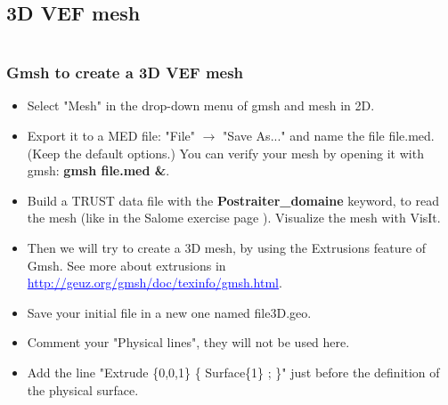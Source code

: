 \documentclass[10pt, hyperref={unicode=true,pdfusetitle, bookmarks=true,bookmarksnumbered=false,bookmarksopen=false, breaklinks=false,pdfborder={0 0 1},backref=true,colorlinks=true,linkcolor=darkblue,pageanchor}]{beamer}
\begin{document}
\subsection{3D VEF mesh}
\begin{frame}
\begin{columns}[c] 
\tableofcontents[sections={1-9},currentsection, currentsubsection]
\tableofcontents[sections={10-16},currentsection, currentsubsection]
\end{columns}
\end{frame}
\begin{frame}
\frametitle{Gmsh to create a 3D VEF mesh}
\begin{block}{}

\begin{itemize}
\item Select "Mesh" in the drop-down menu of gmsh and mesh in 2D.
\item Export it to a MED file: "File" $\rightarrow$ "Save As..." and name the file file.med. (Keep the default options.) You can verify your mesh by opening it with gmsh: \textbf{gmsh file.med \&}.
\item Build a TRUST data file with the \textbf{Postraiter\_domaine} keyword, to read the mesh (like in the Salome exercise page \pageref{read_mesh}). Visualize the mesh with VisIt.
\item Then we will try to create a 3D mesh, by using the Extrusions feature of Gmsh. See more about extrusions in \textcolor{blue}{\underline{http://geuz.org/gmsh/doc/texinfo/gmsh.html}}.
\item Save your initial file in a new one named file3D.geo.
\item Comment your "Physical lines", they will not be used here.
\item Add the line "Extrude \{0,0,1\} \{ Surface\{1\} ; \}" just before the definition of the physical surface.
\end{itemize}

\end{block}
\end{frame}
\end{document}
